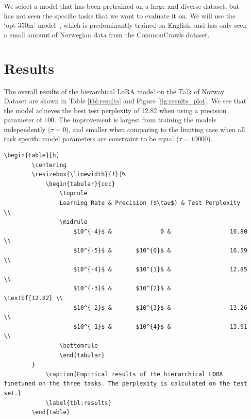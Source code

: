 \documentclass{article}
\begin{document}
We select a model that has been pretrained on a large and diverse dataset, but has not seen the specific tasks that we want to evaluate it on. We will use the `opt-350m' model~\cite{zhang_opt_2022}, which is predominantly trained on English, and has only seen a small amount of Norwegian data from the CommonCrawls dataset.

\section{Results}
The overall results of the hierarchical LoRA model on the Talk of Norway Dataset are shown in Table \ref{tbl:results} and Figure \ref{fig:results_plot}. We see that the model achieves the best test perplexity of 12.82 when using a precision parameter of $100$. The improvement is largest from training the models independently ($\tau = 0$), and smaller when comparing to the limiting case when all task specific model parameters are constraint to be equal ($\tau=10000$).

\begin{lstlisting}[gobble=2]
    \begin{table}[h] 
        \centering
        \resizebox{\linewidth}{!}{%
            \begin{tabular}{ccc}
                \toprule
                Learning Rate & Precision ($\tau$) & Test Perplexity \\
                \midrule
                    $10^{-4}$ &              0 &                 16.80 \\
                    $10^{-5}$ &       $10^{0}$ &                 16.59 \\
                    $10^{-4}$ &       $10^{1}$ &                 12.85 \\
                    $10^{-3}$ &       $10^{2}$ &                 \textbf{12.82} \\
                    $10^{-2}$ &       $10^{3}$ &                 13.26 \\
                    $10^{-1}$ &       $10^{4}$ &                 13.91 \\
                \bottomrule
                \end{tabular}
        }
            \caption{Empirical results of the hierarchical LORA finetuned on the three tasks. The perplexity is calculated on the test set.}
            \label{tbl:results}
        \end{table}
\end{lstlisting}
\end{document}
